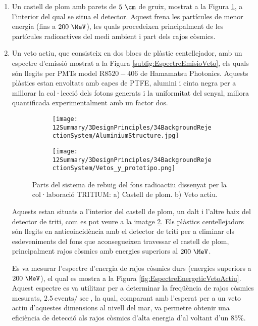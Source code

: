 \begin{enumerate}

\item{} Un castell de plom amb parets de $5~\cm$ de gruix, mostrat a la Figura \ref{subfig:CastellPlom}, a l'interior del qual se situa el detector. Aquest frena les partícules de menor energia (fins a $200~\MeV$), les quals procedeixen principalment de les partícules radioactives del medi ambient i part dels rajos còsmics.

\item{} Un veto actiu, que consisteix en dos blocs de plàstic centellejador, amb un espectre d'emissió mostrat a la Figura \ref{subfig:EspectreEmisioVeto}, els quals són llegits per PMTs model R$8520-406$ de Hamamatsu Photonics. Aquests plàstics estan envoltats amb capes de PTFE, alumini i cinta negra per a millorar la col·lecció dels fotons generats i la uniformitat del senyal, millora quantificada experimentalment amb un factor dos.
\begin{figure}
\centering
    \begin{subfigure}[b]{0.7\textwidth}
    \centering
    \texttt{[image: 12Summary/3DesignPrinciples/34BackgroundRejectionSystem/AluminiumStructure.jpg]}  
        \caption{}\label{subfig:CastellPlom}
    \end{subfigure}
    \hfill
    \begin{subfigure}[b]{0.7\textwidth}
    \centering
    \texttt{[image: 12Summary/3DesignPrinciples/34BackgroundRejectionSystem/Vetos\_y\_prototipo.png]}  
    \caption{\label{subfig:VetoActiu}}
    \end{subfigure}
\caption{Parts del sistema de rebuig del fons radioactiu dissenyat per la col·laboració TRITIUM: a) Castell de plom. b) Veto actiu. \label{fig:SistemaRebuigFonsRadioactiu}}
\end{figure}
Aquests estan situats a l'interior del castell de plom, un dalt i l'altre baix del detector de triti, com es pot veure a la imatge \ref{subfig:VetoActiu}. Els plàstics centellejadors són llegits en anticoincidència amb el detector de triti per a eliminar els esdeveniments del fons que aconsegueixen travessar el castell de plom, principalment rajos còsmics amb energies superiors al $200~\MeV$. 

Es va mesurar l'espectre d'energia de rajos còsmics durs (energies superiors a $200~\MeV$), el qual es mostra a la Figura \ref{fig:EspectreEnergeticVetoActiu}. Aquest espectre es va utilitzar per a determinar la freqüència de rajos còsmics mesurats, $2.5~\text{events}/\sec$, la qual, comparant amb l'esperat per a un veto actiu d'aquestes dimensions al nivell del mar, va permetre obtenir una eficiència de detecció als rajos còsmics d'alta energia d'al voltant d'un $85\%$.


\end{enumerate}
